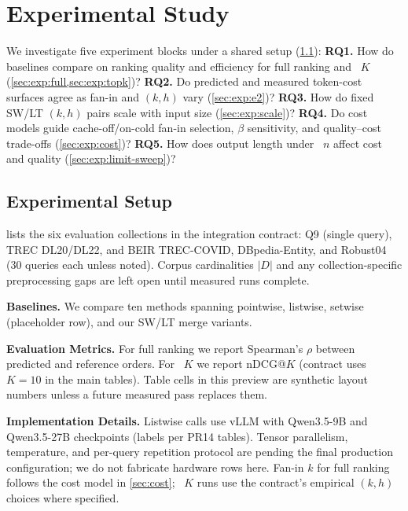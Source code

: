 \section{Experimental Study}
\label{sec:exp}
We investigate five experiment blocks under a shared setup (\cref{sec:exp:setup}):
\textbf{RQ1.} How do baselines compare on ranking quality and efficiency for full ranking and \LIMIT~$K$ (\cref{sec:exp:full,sec:exp:topk})?
\textbf{RQ2.} Do predicted and measured token-cost surfaces agree as fan-in and $(k,h)$ vary (\cref{sec:exp:e2})?
\textbf{RQ3.} How do fixed SW/LT $(k,h)$ pairs scale with input size (\cref{sec:exp:scale})?
\textbf{RQ4.} Do cost models guide cache-off/on-cold fan-in selection, $\beta$ sensitivity, and quality--cost trade-offs (\cref{sec:exp:cost})?
\textbf{RQ5.} How does output length under \LIMIT~$n$ affect cost and quality (\cref{sec:exp:limit-sweep})?

\subsection{Experimental Setup}
\label{sec:exp:setup}



 lists the six evaluation collections in the integration contract: Q9 (single query), TREC DL20/DL22, and BEIR TREC-COVID, DBpedia-Entity, and Robust04 (30 queries each unless noted). Corpus cardinalities $|D|$ and any collection-specific preprocessing gaps are left open until measured runs complete.

\noindent\textbf{Baselines.}
We compare ten methods spanning pointwise, listwise, setwise (placeholder row), and our SW/LT merge variants.


\noindent\textbf{Evaluation Metrics.}
For full ranking we report Spearman's $\rho$ between predicted and reference orders.
For \LIMIT~$K$ we report nDCG@$K$ (contract uses $K{=}10$ in the main tables).
Table cells in this preview are synthetic layout numbers unless a future measured pass replaces them.

\noindent\textbf{Implementation Details.}
Listwise calls use vLLM with Qwen3.5-9B and Qwen3.5-27B checkpoints (labels per PR14 tables).
Tensor parallelism, temperature, and per-query repetition protocol are pending the final production configuration; we do not fabricate hardware rows here.
Fan-in $k$ for full ranking follows the cost model in \cref{sec:cost}; \LIMIT~$K$ runs use the contract's empirical $(k,h)$ choices where specified.

